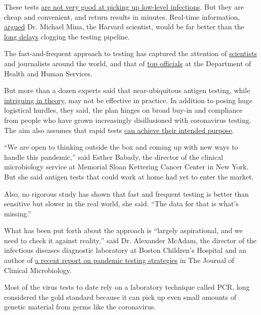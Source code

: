 These tests
\href{https://www.nytimes3xbfgragh.onion/2020/08/06/health/rapid-Covid-tests.html}{are
not very good at picking up low-level infections}. But they are cheap
and convenient, and return results in minutes. Real-time information,
\href{https://www.nytimes3xbfgragh.onion/2020/07/03/opinion/coronavirus-tests.html}{argued}
Dr. Michael Mina, the Harvard scientist, would be far better than the
\href{https://www.nytimes3xbfgragh.onion/2020/07/23/health/coronavirus-testing-supply-shortage.html}{long
delays} clogging the testing pipeline.

The fast-and-frequent approach to testing has captured the attention of
\href{https://www.microbe.tv/twiv/twiv-640/}{scientists} and journalists
around the world, and that of
\href{https://twitter.com/HHS_ASH/status/1300146630201610240}{top
officials} at the Department of Health and Human Services.

But more than a dozen experts said that near-ubiquitous antigen testing,
while
\href{https://www.medrxiv.org/content/10.1101/2020.06.22.20136309v2}{intriguing
in theory}, may not be effective in practice. In addition to posing huge
logistical hurdles, they said, the plan hinges on broad buy-in and
compliance from people who have grown increasingly disillusioned with
coronavirus testing. The aim also assumes that rapid tests
\href{https://jcm.asm.org/content/early/2020/08/07/JCM.01695-20}{can
achieve their intended purpose}.

``We are open to thinking outside the box and coming up with new ways to
handle this pandemic,'' said Esther Babady, the director of the clinical
microbiology service at Memorial Sloan Kettering Cancer Center in New
York. But she said antigen tests that could work at home had yet to
enter the market.

Also, no rigorous study has shown that fast and frequent testing is
better than sensitive but slower in the real world, she said. ``The data
for that is what's missing.''

What has been put forth about the approach is ``largely aspirational,
and we need to check it against reality,'' said Dr. Alexander McAdam,
the director of the infectious diseases diagnostic laboratory at Boston
Children's Hospital and an author of
\href{https://jcm.asm.org/content/early/2020/08/24/JCM.02225-20}{a
recent report on pandemic testing strategies} in The Journal of Clinical
Microbiology.

Most of the virus tests to date rely on a laboratory technique called
PCR, long considered the gold standard because it can pick up even small
amounts of genetic material from germs like the coronavirus.

